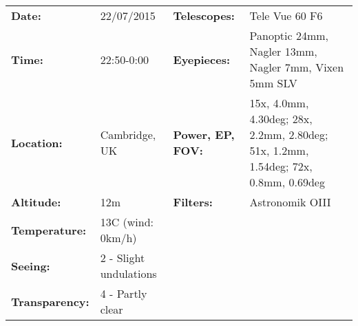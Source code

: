\begin{tabular}{ p{0.9in} p{1.3in} p{1.2in} p{5.2in}}
{\bf Date:} & 22/07/2015 & {\bf Telescopes:} & Tele Vue 60 F6 \\ 
{\bf Time:} & 22:50-0:00 & {\bf Eyepieces:} & Panoptic 24mm, Nagler 13mm, Nagler 7mm, Vixen 5mm SLV \\ 
{\bf Location:} & Cambridge, UK & {\bf Power, EP, FOV:} & 15x, 4.0mm, 4.30deg; 28x, 2.2mm, 2.80deg; 51x, 1.2mm, 1.54deg; 72x, 0.8mm, 0.69deg \\ 
{\bf Altitude:} & 12m & {\bf Filters:} & Astronomik OIII \\ 
{\bf Temperature:} & 13C (wind: 0km/h) & & \\ 
{\bf Seeing:} & 2 - Slight undulations & & \\ 
{\bf Transparency:} & 4 - Partly clear & & \\ 
\end{tabular}
